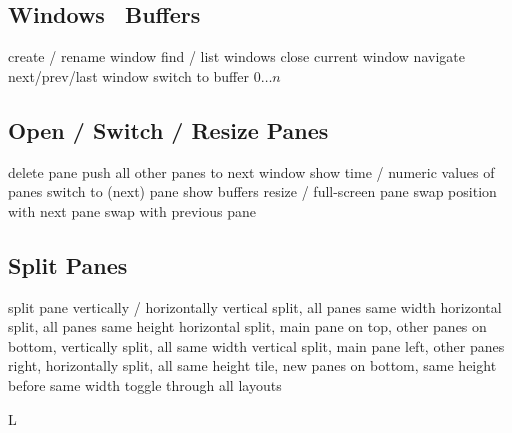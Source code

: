 \subsection{Windows \or\ Buffers}{}
	{create / rename window}
	{find / list windows}
	{close current window}
	{navigate next/prev/last window}
	{switch to buffer $0 \ldots n$}

\subsection{Open / Switch / Resize Panes}{}
	{delete pane}
	{push all other panes to next window}
	{show time / numeric values of panes}
	{switch to (next) pane}
	{show buffers}
	{resize / full-screen pane}
	{swap position with next pane}
	{swap with previous pane}

\subsection{Split Panes}{}
	{split pane vertically / horizontally}
	{vertical split, all panes same width}
	{horizontal split, all panes same height}
	{horizontal split, main pane on top, other panes on bottom, vertically split, all same width}
	{vertical split, main pane left, other panes right, horizontally split, all same height}
	{tile, new panes on bottom, same height before same width}
	{toggle through all layouts}

\copyrightnotice

\supereject
\if L\lr \else\null\vfill\eject\fi
\bye

